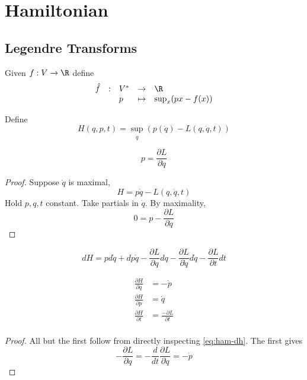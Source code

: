 \documentclass{scrbook}
\numberwithin{thms}{chapter}
\newcommand{\der}{\dot}
\begin{document}
\chapter{Hamiltonian}
\section{Legendre Transforms}
\begin{defn}
  Given $f:V\to\R$ define 
  \[
    \begin{array}{rrlll}
      \hat f &:& V^* &\to& \R \\
      && p &\mapsto& \sup_x(px-f(x))
    \end{array}
  \]
\end{defn}
\begin{defn}
  Define
  \[
    H(q,p,t) = \sup_{\der q}(p(\der q)-L(q,\der q, t))
  \]
\end{defn}
\begin{theorem}
  \[
    p=\frac{\partial L}{\partial \der q}
  \]
\end{theorem}
\begin{proof}
  Suppose $\der q$ is maximal, \ie
  \[
    H = p\der q - L(q,\der q, t)
  \]
  Hold $p,q,t$ constant. Take partials in $\der q$. By maximality,
  \[
    0 = p - \frac{\partial L}{\partial \der q}
  \]
\end{proof}
\begin{note}
  \begin{equation}
    dH = pd\der q + dp \der q -\frac{\partial L}{\partial q}dq -\frac{\partial L}{\partial \der q}d\der q-\frac{\partial L}{\partial t}dt
\label{eq:ham-dh}
\end{equation}
\end{note}
\begin{theorem}
  \begin{align*}
    \frac{\partial H}{\partial q} &= -\der p \\
    \frac{\partial H}{\partial p} &= \der q \\
    \frac{\partial H}{\partial t} &= \frac{-\partial L}{\partial t} \\
  \end{align*}
\end{theorem}
\begin{proof}
  All but the first follow from directly inspecting \cref{eq:ham-dh}. The first gives
  \[
    -\frac{\partial L}{\partial q} = -\frac{d}{dt} \frac{\partial L}{\partial \der q} = -\der p
  \]
\end{proof}
\end{document}
